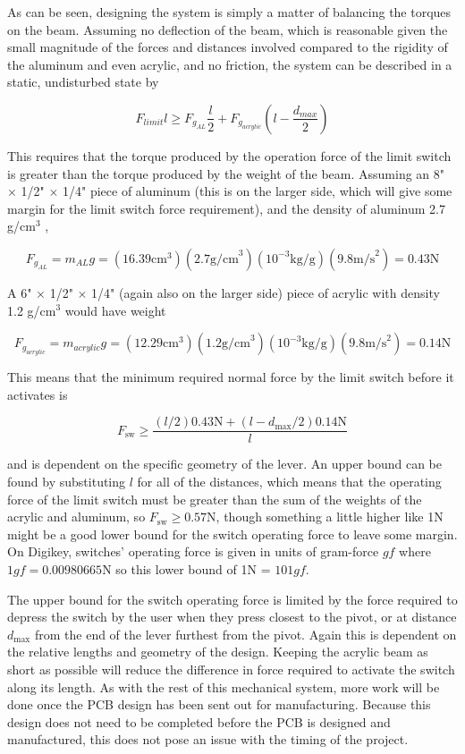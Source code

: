 \documentclass{article}
\begin{document}
	As can be seen, designing the system is simply a matter of balancing the torques on the beam.  Assuming no deflection of the beam, which is reasonable given the small magnitude of the forces and distances involved compared to the rigidity of the aluminum and even acrylic, and no friction, the system can be described in a static, undisturbed state by

	$$ F_{limit} l \ge F_{g_{AL}} \frac{l}{2} + F_{g_{acrylic}} \left( l - \frac{d_{max}}{2} \right) $$

	This requires that the torque produced by the operation force of the limit switch is greater than the torque produced by the weight of the beam.  Assuming an 8" $\times$ 1/2" $\times$ 1/4" piece of aluminum (this is on the larger side, which will give some margin for the limit switch force requirement), and the density of aluminum 2.7 g/cm$^3$ \cite{SolidsDensities}, 

	$$ F_{g_{AL}} = m_{AL}g = \left(16.39\text{cm}^3\right) \left(2.7 \text{g/cm}^3 \right) \left( 10^{-3}\text{kg}/\text{g} \right) \left( 9.8 \text{m/s}^2 \right) = 0.43 \text{N} $$

	A 6" $\times$ 1/2" $\times$ 1/4" (again also on the larger side) piece of acrylic with density 1.2 g/cm$^3$ \cite{SolidsDensities} would have weight

	$$ F_{g_{acrylic}} = m_{acrylic}g = \left( 12.29\text{cm}^3 \right) \left( 1.2 \text{g/cm}^3 \right) \left( 10^{-3}\text{kg}/\text{g} \right) \left( 9.8 \text{m/s}^2 \right) = 0.14\text{N}$$

	This means that the minimum required normal force by the limit switch before it activates is

	$$ F_\text{sw} \ge \frac{(l/2)0.43\text{N} + (l-d_\text{max}/2) 0.14\text{N}}{l} $$

	and is dependent on the specific geometry of the lever.  An upper bound can be found by substituting $l$ for all of the distances, which means that the operating force of the limit switch must be greater than the sum of the weights of the acrylic and aluminum, so $F_\text{sw} \ge 0.57\text{N}$, though something a little higher like 1N might be a good lower bound for the switch operating force to leave some margin.  On Digikey, switches' operating force is given in units of gram-force $gf$ where $1gf = 0.00980665\text{N}$ so this lower bound of 1N = $101gf$.

	The upper bound for the switch operating force is limited by the force required to depress the switch by the user when they press closest to the pivot, or at distance $d_\text{max}$ from the end of the lever furthest from the pivot.  Again this is dependent on the relative lengths and geometry of the design.  Keeping the acrylic beam as short as possible will reduce the difference in force required to activate the switch along its length.  As with the rest of this mechanical system, more work will be done once the PCB design has been sent out for manufacturing.  Because this design does not need to be completed before the PCB is designed and manufactured, this does not pose an issue with the timing of the project.
\end{document}
